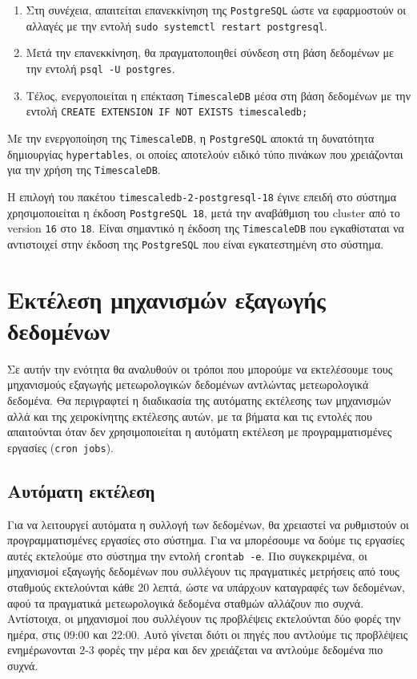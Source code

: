 \documentclass[a4paper,12pt]{article}
\begin{document}
\begin{enumerate}
\begin{enumerate}
\item Στη συνέχεια, απαιτείται επανεκκίνηση της \texttt{PostgreSQL} ώστε να εφαρμοστούν οι αλλαγές με την εντολή \texttt{sudo systemctl restart postgresql}.

\item Μετά την επανεκκίνηση, θα πραγματοποιηθεί σύνδεση στη βάση δεδομένων με την εντολή \texttt{psql -U postgres}.

\item Τέλος, ενεργοποιείται η επέκταση \texttt{TimescaleDB} μέσα στη βάση δεδομένων με την εντολή \texttt{CREATE EXTENSION IF NOT EXISTS timescaledb;}

\end{enumerate}

Με την ενεργοποίηση της \texttt{TimescaleDB}, η \texttt{PostgreSQL} αποκτά τη δυνατότητα δημιουργίας \texttt{hypertables}, οι οποίες αποτελούν ειδικό τύπο πινάκων που χρειάζονται για την χρήση της \texttt{TimescaleDB}.

\end{enumerate}

Η επιλογή του πακέτου \texttt{timescaledb-2-postgresql-18} έγινε επειδή στο σύστημα χρησιμοποιείται η έκδοση \texttt{PostgreSQL 18}, μετά την αναβάθμιση του cluster από το version \texttt{16} στο \texttt{18}. Είναι σημαντικό η έκδοση της \texttt{TimescaleDB} που εγκαθίσταται να αντιστοιχεί στην έκδοση της \texttt{PostgreSQL} που είναι εγκατεστημένη στο σύστημα.







\section{Εκτέλεση μηχανισμών εξαγωγής δεδομένων}\label{sec:how_to_run}
Σε αυτήν την ενότητα θα αναλυθούν οι τρόποι που μπορούμε να εκτελέσουμε τους μηχανισμούς εξαγωγής μετεωρολογικών δεδομένων αντλώντας μετεωρολογικά δεδομένα. Θα περιγραφτεί η διαδικασία της αυτόματης εκτέλεσης των μηχανισμών αλλά και της χειροκίνητης εκτέλεσης αυτών, με τα βήματα και τις εντολές που απαιτούνται όταν δεν χρησιμοποιείται η αυτόματη εκτέλεση με προγραμματισμένες εργασίες (\texttt{cron jobs}).

\subsection{Αυτόματη εκτέλεση}\label{sec:automated_scraper_execution}
Για να λειτουργεί αυτόματα η συλλογή των δεδομένων, θα χρειαστεί να ρυθμιστούν οι προγραμματισμένες εργασίες στο σύστημα. Για να μπορέσουμε να δούμε τις εργασίες αυτές εκτελούμε στο σύστημα την εντολή \texttt{crontab -e}. Πιο συγκεκριμένα, οι μηχανισμοί εξαγωγής δεδομένων που συλλέγουν τις πραγματικές μετρήσεις από τους σταθμούς εκτελούνται κάθε 20 λεπτά, ώστε να υπάρχoυν καταγραφές των δεδομένων, αφού τα πραγματικά μετεωρολογικά δεδομένα σταθμών αλλάζουν πιο συχνά. Αντίστοιχα, οι μηχανισμοί που συλλέγουν τις προβλέψεις εκτελούνται δύο φορές την ημέρα, στις 09:00 και 22:00. Αυτό γίνεται διότι οι πηγές που αντλούμε τις προβλέψεις ενημέρωνονται 2-3 φορές την μέρα και δεν χρειάζεται να αντλούμε δεδομένα πιο συχνά.
\end{document}
